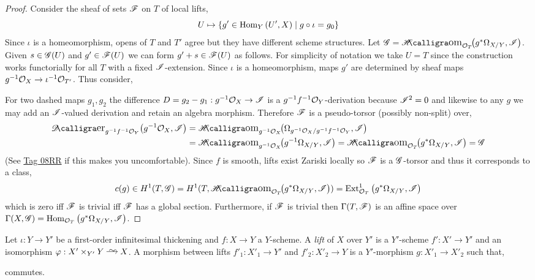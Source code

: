 \documentclass[12pt]{article}
\begin{document}
\begin{proof}
Consider the sheaf of sets $\mathscr{F}$ on $T$ of local lifts,
\[ U \mapsto \{ g' \in \mathrm{Hom}_{Y} \left( U', X \right) \mid g \circ \iota = g_0 \} \]
Since $\iota$ is a homeomorphism, opens of $T$ and $T'$ agree but they have different scheme structures. Let $\G = \shHom{\struct{T}}{g^* \Omega_{X/Y}}{\I}$. Given $s \in \mathscr{G}(U)$ and $g' \in \mathscr{F}(U)$ we can form $g' + s \in \mathscr{F}(U)$ as follows. For simplicity of notation we take $U = T$ since the construction works functorially for all $T$ with a fixed $\mathscr{I}$-extension. Since $\iota$ is a homeomorphism, maps $g'$ are determined by sheaf maps $g^{-1} \mathcal{O}_{X} \to \iota^{-1} \mathcal{O}_{T'}$. Thus consider,
\begin{center}
\end{center}
For two dashed maps $g_1, g_2$ the difference $D = g_2 - g_1 : g^{-1}\mathcal{O}_{X} \to \mathscr{I}$ is a $g^{-1} f^{-1} \mathcal{O}_{Y}$-derivation because $\mathscr{I}^2 = 0$ and likewise to any $g$ we may add an $\mathscr{I}$-valued derivation and retain an algebra morphism. Therefore $\mathscr{F}$ is a pseudo-torsor (possibly non-split) over,
\begin{align*}
\shDero{g^{-1} f^{-1} \struct{Y}}{g^{-1} \struct{X}}{\I} & = \shHom{g^{-1} \struct{X}}{\Omega_{g^{-1} \struct{X}/g^{-1} f^{-1} \struct{Y}}}{\I} 
\\
& = \shHom{g^{-1} \struct{X}}{g^{-1} \Omega_{X/Y}}{\I} = \shHom{\struct{T}}{g^* \Omega_{X/Y}}{\I} = \G
\end{align*}
(See \href{https://stacks.math.columbia.edu/tag/08RR}{Tag 08RR}  if this makes you uncomfortable).
Since $f$ is smooth, lifts exist Zariski locally so $\mathscr{F}$ is a $\mathscr{G}$-torsor and thus it corresponds to a class,
\[ c(g) \in H^1(T, \G) = H^1(T, \shHom{\struct{T}}{g^* \Omega_{X/Y}}{\I}) = \Ext{1}{\struct{T}}{g^* \Omega_{X/Y}}{\I} \]
which is zero iff $\mathscr{F}$ is trivial iff $\mathscr{F}$ has a global section. Furthermore, if $\mathscr{F}$ is trivial then $\Gamma(T, \mathscr{F})$ is an affine space over $\Gamma(X, \mathscr{G}) = \mathrm{Hom}_{\mathcal{O}_{T}} \left( g^* \Omega_{X/Y}, \mathscr{I} \right)$.
\end{proof}


\begin{defn}
Let $\iota : Y \to Y'$ be a first-order infinitesimal thickening and $f : X \to Y$ a $Y$-scheme. A \textit{lift} of $X$ over $Y'$ is a $Y'$-scheme $f' : X' \to Y'$ and an isomorphism $\varphi : X' \times_{Y'} Y \iso X$. A morphism between lifts $f'_1 : X'_1 \to Y'$ and $f'_2 : X'_2 \to Y$ is a $Y'$-morphism $g : X'_1 \to X'_2$ such that,
\begin{center}
\end{center}
commutes.
\end{defn}
\end{document}
